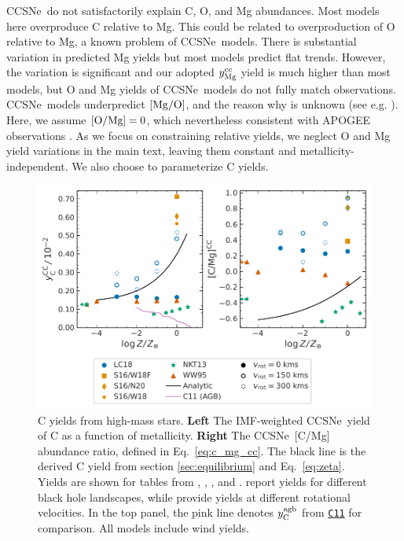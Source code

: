 \documentclass[fleqn,
usenatbib]{mnras}
\newcommand{\cxi}{\texttt{\hyperlink{C11}{C11}}}
\newcommand{\apogee}{APOGEE}
\newcommand{\cc}{CCSNe}
\newcommand{\imf}{IMF}
\newcommand{\Yoc}{\ensuremath{y_{\rm Mg}^{\rm cc}}}
\newcommand{\Ycagb}{\ensuremath{y_{\rm C}^{\rm agb}}}
\begin{document}
\cc\ do not satisfactorily explain C, O, and Mg abundances.
Most models here overproduce C relative to Mg. This could be related to overproduction of O relative to Mg, a known problem of \cc\ models.
There is substantial variation in predicted Mg yields but most models predict flat trends. However, the variation is significant and our adopted $\Yoc$ yield is much higher than most models, but O and Mg yields of \cc\ models do not fully match observations. \cc\ models underpredict $[{\rm Mg}/{\rm O}]$, and the reason why is unknown (see e.g. \citealt{emily+21}). Here, we assume ${\rm [O/Mg]} = 0$, which nevertheless consistent with \apogee{} observations \citep{weinberg+19, weinberg+22}.
 As we focus on constraining relative yields, we neglect O and Mg yield variations in the main text, leaving them constant and metallicity-independent. We also choose to parameterize C yields.

\begin{figure}
    \centering
    \includegraphics{cc_yields.pdf}
    \caption[]{
        C yields from high-mass stars.
        \textbf{Left} The \imf-weighted \cc\ yield of C as a function of metallicity.
        \textbf{Right} The \cc\ [C/Mg] abundance ratio, defined in Eq.~\ref{eq:c_mg_cc}. The black line is the derived C yield from section \ref{sec:equilibrium} and Eq.~\ref{eq:zeta}. Yields are shown for tables from 
    \citet[red triangles]{WW95}, \citet[orange squares and diamonds]{sukhbold+16}, 
    \citet[green stars]{NKT13}, and \citet[blue circles]{LC18}. \citet{sukhbold+16} report yields for different black hole landscapes, while \citet{LC18} provide yields at different rotational velocities.
    In the top panel, the pink line denotes $\Ycagb$ from \cxi{} for comparison. All models include wind yields. 
}
    \label{fig:y_cc}
\end{figure}
\end{document}
